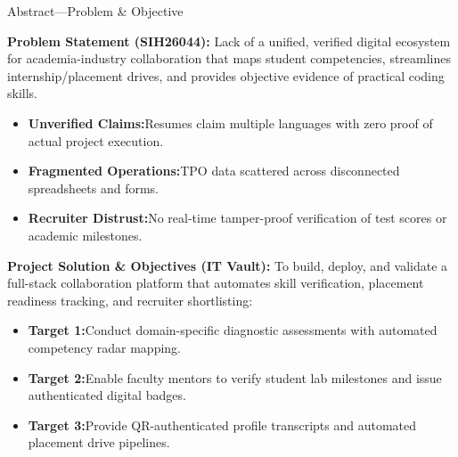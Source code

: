 \documentclass[aspectratio=169,10pt,xcolor={table,dvipsnames}]{beamer}
\begin{document}
\begin{frame}[t]{Abstract\enspace---\enspace Problem \& Objective}
  \begin{tcolorbox}[
    enhanced,colback=LightSilver,colframe=BorderColor,
    arc=2.5pt,boxrule=0.7pt,
    left=8pt,right=8pt,top=4pt,bottom=4pt]
    \fontsize{7.2}{8.8}\selectfont
    \textbf{\color{Navy}Problem Statement (SIH26044):}\quad
    Lack of a unified, verified digital ecosystem for academia-industry collaboration that maps student competencies, streamlines internship/placement drives, and provides objective evidence of practical coding skills.
    \vspace{2pt}
    \begin{itemize}\setlength{\itemsep}{1.5pt}
      \item \textbf{Unverified Claims:}\;Resumes claim multiple languages with zero proof of actual project execution.
      \item \textbf{Fragmented Operations:}\;TPO data scattered across disconnected spreadsheets and forms.
      \item \textbf{Recruiter Distrust:}\;No real-time tamper-proof verification of test scores or academic milestones.
    \end{itemize}
  \end{tcolorbox}

  \vspace{0.08cm}

  \begin{tcolorbox}[
    enhanced,colback=LightSilver,colframe=BorderColor,
    arc=2.5pt,boxrule=0.7pt,
    left=8pt,right=8pt,top=4pt,bottom=4pt]
    \fontsize{7.2}{8.8}\selectfont
    \textbf{\color{Navy}Project Solution \& Objectives (IT Vault):}\quad
    To build, deploy, and validate a full-stack collaboration platform that automates skill verification, placement readiness tracking, and recruiter shortlisting:
    \vspace{2pt}
    \begin{itemize}\setlength{\itemsep}{1.5pt}
      \item \textbf{Target 1:}\;Conduct domain-specific diagnostic assessments with automated competency radar mapping.
      \item \textbf{Target 2:}\;Enable faculty mentors to verify student lab milestones and issue authenticated digital badges.
      \item \textbf{Target 3:}\;Provide QR-authenticated profile transcripts and automated placement drive pipelines.
    \end{itemize}
  \end{tcolorbox}


\end{frame}
\end{document}
